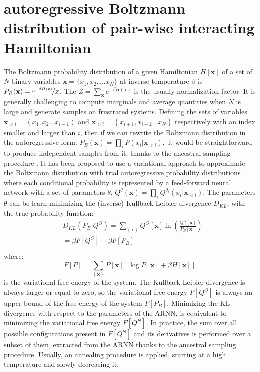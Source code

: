 \documentclass[aps,physrev,10pt,floatfix,reprint]{revtex4-2}
\begin{document}
\section{autoregressive Boltzmann distribution of pair-wise interacting Hamiltonian}
\label{sec:ARNN_boltzmann}
The Boltzmann probability distribution of a given Hamiltonian $H[\mathbf{x}]$ of a set of $N$ binary variables $\mathbf{x}=\{x_1, x_2,...x_N\}$ at inverse temperature $\beta$ is $P_{B}(\mathbf{x}) = \nicefrac{e^{-\beta H\left(\mathbf{x}\right)}}{Z}$. The $Z=\sum_{\mathbf{x}}e^{-\beta H\left(\mathbf{x}\right)}$ is the usually normalization factor.
It is generally challenging to compute marginals and average quantities when $N$ is large and generate samples on frustrated systems. Defining the sets of variables $\mathbf{x}_{<i}=\left(x_{1},x_{2}\dots x_{i-1}\right)$ and $\mathbf{x}_{>i}=\left(x_{i+1},x_{i+2}\dots x_{N}\right)$ respectively with an index smaller and larger than $i$, then if we can rewrite the Boltzmann distribution in the autoregressive form:
$
P_{B}\left(\mathbf{x}\right)=\prod_{i}P\left(x_{i}|\mathbf{x}_{<i}\right),
$
it would be straightforward to produce independent samples from it, thanks to the ancestral sampling procedure \cite{Wu2019}. It has been proposed \cite{Wu2019} to use a variational approach to approximate the Boltzmann distribution with trial autoregressive probability distributions where each conditional probability is represented by a feed-forward neural network with a set of parameters ${\theta}$,
$
Q^{\theta}\left(\mathbf{x}\right)=\prod_{i}Q^{\theta_i}\left(x_{i}|\mathbf{x}_{<i}\right)
$.
The parameters ${\theta}$ can be learn minimizing the (inverse) Kullback-Leibler divergence $D_{KL}$,
with the true probability function:
\begin{equation}
\begin{split}
& D_{KL}\left(P_{B}|Q^{\Theta}\right) =  \sum_{\left\{ \mathbf{x} \right\} } Q^{\Theta} [\mathbf{x}]\ln\left(\frac{Q^{\Theta}[\mathbf{x}]}{P_{B}[\mathbf{x}]}\right)  \\
& = \beta F[Q^{\Theta}] - \beta F[P_{B}]\\
\end{split}
\label{eq:kl}    
\end{equation}
where:
$$F[P]= \sum_{\left\{ \mathbf{x} \right\}}P[\mathbf{x}]\left[\log P[\mathbf{x}] + \beta H[\mathbf{x}] \right] 
$$
is the variational free energy of the system. The Kullback-Leibler divergence is always larger or equal to zero, so the variational free energy $F[Q^{\Theta}]$ is always an upper bound of the free energy of the system $F[P_{B}]$. Minimizing the KL divergence with respect to the parameters of the ARNN, is equivalent to minimizing the variational free energy $F[Q^{\Theta}]$. In practice, the sum over all possible configurations present in $F[Q^{\Theta}]$ and its derivatives is performed over a subset of them, extracted from the ARNN thanks to the ancestral sampling procedure\cite{Wu2019}. Usually, an annealing procedure is applied, starting at a high temperature and slowly decreasing it.
\end{document}
